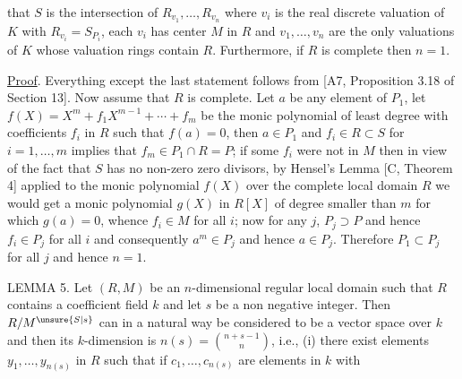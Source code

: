 that $S$ is the intersection of $R_{v_1},\ldots,R_{v_n}$ where $v_i$ is the real discrete valuation of $K$ with $R_{v_i}=S_{P_i}$, each $v_i$ has center $M$ in $R$ and $v_1,\ldots,v_n$ are the only valuations of $K$ whose valuation rings contain $R$. Furthermore, if $R$ is complete then $n=1$.

\uline{Proof}. Everything except the last statement follows from [A7, Proposition 3.18 of Section 13]. Now assume that $R$ is complete. Let $a$ be any element of $P_1$, let $f(X)=X^m+f_1X^{m-1}+\cdots+f_m$ be the monic polynomial of least degree with coefficients $f_i$ in $R$ such that $f(a)=0$, then $a\in P_1$ and $f_i\in R\subset S$ for $i=1,\ldots,m$ implies that $f_m\in P_1\cap R=P$; if some $f_i$ were not in $M$ then in view of the fact that $S$ has no non-zero zero divisors, by Hensel's Lemma [C, Theorem 4] applied to the monic polynomial $f(X)$ over the complete local domain $R$ we would get a monic polynomial $g(X)$ in $R[X]$ of degree smaller than $m$ for which $g(a)=0$, whence $f_i\in M$ for all $i$; now for any $j$, $P_j\supset P$ and hence $f_i\in P_j$ for all $i$ and consequently $a^m\in P_j$ and hence $a\in P_j$. Therefore $P_1\subset P_j$ for all $j$ and hence $n=1$.

LEMMA 5. Let $(R,M)$ be an $n$-dimensional regular local domain such that $R$ contains a coefficient field $k$ and let $s$ be a non negative integer. Then $R/M^{\unsure{S|s}}$ can in a natural way be considered to be a vector space over $k$ and then its $k$-dimension is $n(s)=\binom{n+s-1}{n}$, i.e., (i) there exist elements $y_1,\ldots,y_{n(s)}$ in $R$ such that if $c_1,\ldots,c_{n(s)}$ are elements in $k$ with
